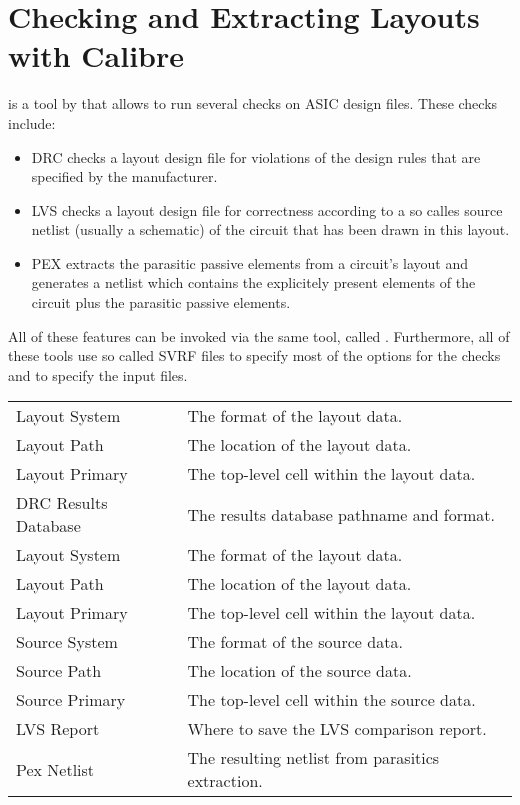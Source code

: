 \chapter{Checking and Extracting Layouts with Calibre}
\label{chap:calibre}

 is a tool by  that allows to run several
checks on \gls{ASIC} design files. These checks include:
\begin{itemize}
	\item \acrfull{DRC}
		checks a layout design file for violations of the design rules that are
		specified by the manufacturer.
	\item \acrfull{LVS}
		checks a layout design file for correctness according to a so calles
		source netlist (usually a schematic) of the circuit that has been drawn
		in this layout.
	\item \acrfull{PEX}
		extracts the parasitic passive elements from a circuit's layout and
		generates a  netlist which contains the explicitely present
		elements of the circuit plus the parasitic passive elements.
\end{itemize}

All of these features can be invoked via the same tool, called .
Furthermore, all of these tools use so called \acrfull{SVRF} files to specify
most of the options for the checks and to specify the input files.

\begin{table}[h]
	\begin{center}
\begin{tabular}{l|l}
Layout System & The format of the layout data.\\
Layout Path & The location of the layout data.\\
Layout Primary & The top-level cell within the layout data.\\
DRC Results Database & The results database pathname and format.\\
\hline
Layout System & The format of the layout data.\\
Layout Path & The location of the layout data.\\
Layout Primary & The top-level cell within the layout data.\\
Source System & The format of the source data.\\
Source Path & The location of the source data.\\
Source Primary & The top-level cell within the source data.\\
LVS Report & Where to save the LVS comparison report.\\
\hline
Pex Netlist & The resulting netlist from parasitics extraction.
\end{tabular}
	\end{center}
\end{table}

